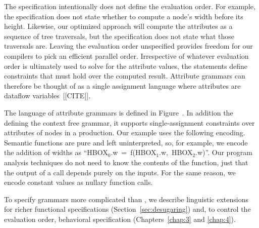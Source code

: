 The specification intentionally does not define the evaluation order. For example, the specification does not state whether to compute a node's width before its height. Likewise, our optimized approach will compute the attributes as a sequence of tree traversals, but the specification does not state what those traversals are. Leaving the evaluation order unspecified provides freedom for our compilers to pick an efficient parallel order. Irrespective of whatever evaluation order is ultimately used to solve for the attribute values, the statements define constraints that must hold over the computed result. Attribute grammars can therefore be thought of as a single assignment language where attributes are dataflow variables~[[CITE]].


The language of attribute grammars is defined in Figure~. In addition the defining the context free grammar, it supports single-assignment constraints over attributes of nodes in a production. Our example uses the following encoding. Semantic functions are pure and left uninterpreted, so, for example, we encode the addition of widths as ``\mbox{HBOX$_0$.w = f(HBOX$_1$.w, HBOX$_2$.w)}''. Our program analysis techniques do not need to know the contents of the function, just that the output of a call depends purely on the inputs.  For the same reason, we encode constant values as nullary function calls. 

To specify grammars more complicated than \hlang{}, we describe linguistic extensions for richer functional specifications (Section~\ref{sec:desugaring}) and, to control the evaluation order, behavioral specification (Chapters~\ref{chap:3} and \ref{chap:4}).

